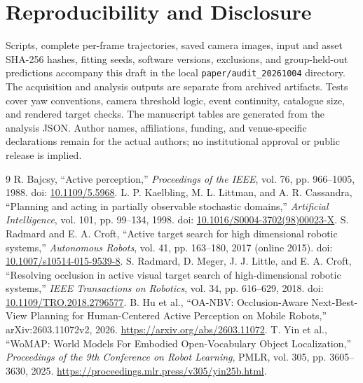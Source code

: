 \documentclass[10pt,twocolumn,a4paper]{article}
\begin{document}
\section*{Reproducibility and Disclosure}
Scripts, complete per-frame trajectories, saved camera images, input and asset SHA-256 hashes, fitting seeds, software versions, exclusions, and group-held-out predictions accompany this draft in the local \texttt{paper/audit\_20261004} directory. The acquisition and analysis outputs are separate from archived artifacts. Tests cover yaw conventions, camera threshold logic, event continuity, catalogue size, and rendered target checks. The manuscript tables are generated from the analysis JSON. Author names, affiliations, funding, and venue-specific declarations remain for the actual authors; no institutional approval or public release is implied.

\begin{thebibliography}{9}
 R. Bajcsy, ``Active perception,'' \emph{Proceedings of the IEEE}, vol. 76, pp. 966--1005, 1988. doi: \href{https://doi.org/10.1109/5.5968}{10.1109/5.5968}.
 L. P. Kaelbling, M. L. Littman, and A. R. Cassandra, ``Planning and acting in partially observable stochastic domains,'' \emph{Artificial Intelligence}, vol. 101, pp. 99--134, 1998. doi: \href{https://doi.org/10.1016/S0004-3702(98)00023-X}{10.1016/S0004-3702(98)00023-X}.
 S. Radmard and E. A. Croft, ``Active target search for high dimensional robotic systems,'' \emph{Autonomous Robots}, vol. 41, pp. 163--180, 2017 (online 2015). doi: \href{https://doi.org/10.1007/s10514-015-9539-8}{10.1007/s10514-015-9539-8}.
 S. Radmard, D. Meger, J. J. Little, and E. A. Croft, ``Resolving occlusion in active visual target search of high-dimensional robotic systems,'' \emph{IEEE Transactions on Robotics}, vol. 34, pp. 616--629, 2018. doi: \href{https://doi.org/10.1109/TRO.2018.2796577}{10.1109/TRO.2018.2796577}.
 B. Hu et al., ``OA-NBV: Occlusion-Aware Next-Best-View Planning for Human-Centered Active Perception on Mobile Robots,'' arXiv:2603.11072v2, 2026. \url{https://arxiv.org/abs/2603.11072}.
 T. Yin et al., ``WoMAP: World Models For Embodied Open-Vocabulary Object Localization,'' \emph{Proceedings of the 9th Conference on Robot Learning}, PMLR, vol. 305, pp. 3605--3630, 2025. \url{https://proceedings.mlr.press/v305/yin25b.html}.
\end{thebibliography}
\end{document}
